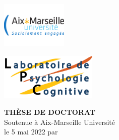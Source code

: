 \setmainfont{Titillium}
\thispagestyle{empty}

\begin{center}
	\begin{minipage}[c]{.5\linewidth}
		\raggedright\includegraphics[height=6em]{logos/logo_amu_excellence}
	\end{minipage}\hfill
	\begin{minipage}[c]{.5\linewidth}
		\raggedleft\includegraphics[height=6em]{logos/logo_lpc.png}
	\end{minipage}\hfill
\end{center}

\vspace{1em}

\begin{center}
	\begin{minipage}[c]{.6\linewidth}
		\dhorline{\textwidth}{4pt}
	\end{minipage}\hfill
	\begin{minipage}[c]{.4\linewidth}
	\end{minipage}\hfill
\end{center}

\begin{flushleft}
    \huge\textbf{\textcolor{cyanamu}{THÈSE DE DOCTORAT}}\\
	\Large Soutenue à Aix-Marseille Université\\
	\Large le 5 mai 2022 par\\
\end{flushleft}

